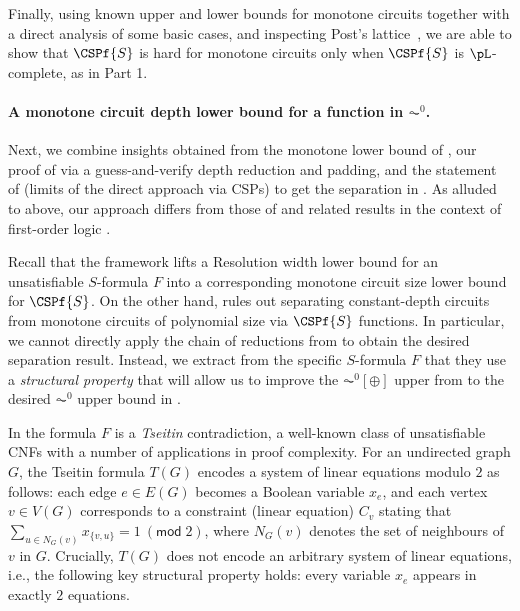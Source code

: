 \documentclass[11pt]{article}
\begin{document}
Finally, using known upper and lower bounds for monotone circuits together
with a direct analysis of some basic cases,
and inspecting Post's lattice~\cite{post41,playing_one,playing_two},
we are able to show that
$\CSPf{S}$ is hard for monotone circuits
only when
$\CSPf{S}$ is $\pL$-complete, as in  Part 1.

\paragraph{A monotone circuit depth lower bound for a function in $\AC^0$.} Next, we combine insights obtained from the monotone lower bound of \cite{gkrs19}, our proof of  via a guess-and-verify depth reduction and padding, and the statement of  (limits of the direct approach via CSPs) to get the separation in . As alluded to above, our approach differs from those of \citep{okolnishnikova_1982, ajtai_gurevich_1987, BST13,  cos15} and related results in the context of first-order logic \citep{DBLP:conf/lics/Stolboushkin95, DBLP:conf/lics/Kuperberg21, DBLP:journals/corr/abs-2201-11619}. 


Recall that the \citep{gkrs19} framework lifts a Resolution width lower bound for an unsatisfiable $S$-formula $F$ into a corresponding monotone circuit size lower bound for $\CSPf{S}$. On the other hand,  rules out separating constant-depth circuits from monotone circuits of polynomial size via $\CSPf{S}$ functions. In particular, we cannot directly apply the chain of reductions from \citep{gkrs19} to obtain the desired separation result. Instead, we extract from the specific $S$-formula $F$ that they use a \emph{structural property} that will allow us to improve the $\AC^0[\oplus]$ upper from  to the desired $\AC^0$ upper bound in .

In \citep{gkrs19} the formula $F$ is a \emph{Tseitin} contradiction, a well-known class of unsatisfiable CNFs with a number of applications in proof complexity. For an undirected graph $G$, the Tseitin formula $T(G)$ encodes a system of linear equations modulo $2$ as follows: each edge $e \in E(G)$ becomes a Boolean variable $x_e$, and each vertex $v \in V(G)$ corresponds to a constraint (linear equation) $C_v$ stating that $\sum_{u \in N_G(v)} x_{\{v,u\}} = 1~(\mathsf{mod}\;2)$, where $N_G(v)$ denotes the set of neighbours of $v$ in $G$. Crucially, $T(G)$ does not encode an arbitrary system of linear equations, i.e., the following key structural property holds: every variable $x_e$ appears in exactly $2$ equations. 
\end{document}
